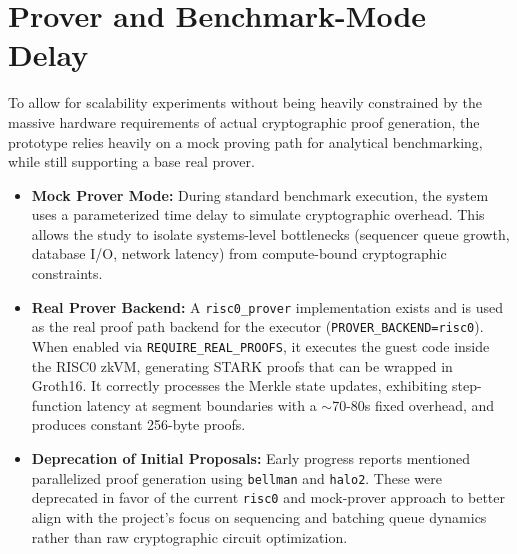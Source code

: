 \section{Prover and Benchmark-Mode Delay}
\label{sec:prover}
To allow for scalability experiments without being heavily constrained by the massive hardware requirements of actual cryptographic proof generation, the prototype relies heavily on a mock proving path for analytical benchmarking, while still supporting a base real prover.

\begin{itemize}
    \item \textbf{Mock Prover Mode:} During standard benchmark execution, the system uses a parameterized time delay to simulate cryptographic overhead. This allows the study to isolate systems-level bottlenecks (sequencer queue growth, database I/O, network latency) from compute-bound cryptographic constraints.
    \item \textbf{Real Prover Backend:} A \texttt{risc0\_prover} implementation exists and is used as the real proof path backend for the executor (\texttt{PROVER\_BACKEND=risc0}). When enabled via \texttt{REQUIRE\_REAL\_PROOFS}, it executes the guest code inside the RISC0 zkVM, generating STARK proofs that can be wrapped in Groth16. It correctly processes the Merkle state updates, exhibiting step-function latency at segment boundaries with a $\sim$70-80s fixed overhead, and produces constant 256-byte proofs.
    \item \textbf{Deprecation of Initial Proposals:} Early progress reports mentioned parallelized proof generation using \texttt{bellman} and \texttt{halo2}. These were deprecated in favor of the current \texttt{risc0} and mock-prover approach to better align with the project's focus on sequencing and batching queue dynamics rather than raw cryptographic circuit optimization.
\end{itemize}
